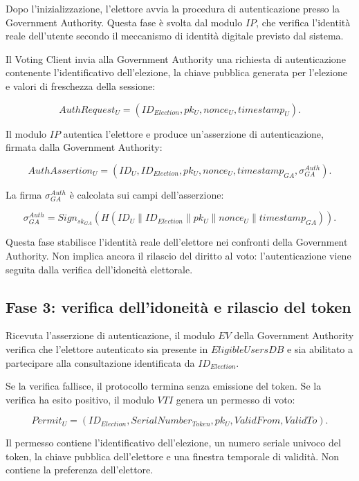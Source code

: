 \documentclass[a4paper,12pt]{article}
\begin{document}
Dopo l'inizializzazione, l'elettore avvia la procedura di autenticazione presso la Government Authority. 
Questa fase \`e svolta dal modulo \(IP\), che verifica l'identit\`a reale dell'utente secondo il meccanismo di identit\`a digitale previsto dal sistema.

Il Voting Client invia alla Government Authority una richiesta di autenticazione contenente l'identificativo dell'elezione, la chiave pubblica generata per l'elezione e valori di freschezza della sessione:

\[
	AuthRequest_U =
	(ID_{Election}, pk_U, nonce_U, timestamp_U).
\]

Il modulo \(IP\) autentica l'elettore e produce un'asserzione di autenticazione, firmata dalla Government Authority:

\[
	AuthAssertion_U =
	(ID_U, ID_{Election}, pk_U, nonce_U, timestamp_{GA}, \sigma_{GA}^{Auth}).
\]

La firma \(\sigma_{GA}^{Auth}\) \`e calcolata sui campi dell'asserzione:

\[
	\sigma_{GA}^{Auth} =
	Sign_{sk_{GA}}(H(ID_U \parallel ID_{Election} \parallel pk_U \parallel nonce_U \parallel timestamp_{GA})).
\]

Questa fase stabilisce l'identit\`a reale dell'elettore nei confronti della Government Authority. 
Non implica ancora il rilascio del diritto al voto: l'autenticazione viene seguita dalla verifica dell'idoneit\`a elettorale.

\subsection{Fase 3: verifica dell'idoneit\`a e rilascio del token}

Ricevuta l'asserzione di autenticazione, il modulo \(EV\) della Government Authority verifica che l'elettore autenticato sia presente in \(EligibleUsersDB\) e sia abilitato a partecipare alla consultazione identificata da \(ID_{Election}\).

Se la verifica fallisce, il protocollo termina senza emissione del token. 
Se la verifica ha esito positivo, il modulo \(VTI\) genera un permesso di voto:

\[
	Permit_U =
	(ID_{Election}, SerialNumber_{Token}, pk_U, ValidFrom, ValidTo).
\]

Il permesso contiene l'identificativo dell'elezione, un numero seriale univoco del token, la chiave pubblica dell'elettore e una finestra temporale di validit\`a. 
Non contiene la preferenza dell'elettore.
\end{document}
